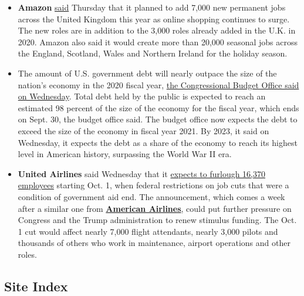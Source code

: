 \begin{itemize}
\item
  \textbf{Amazon}
  \href{https://amazonuk.gcs-web.com/news-releases/news-release-details/amazon-create-10000-new-permanent-jobs-across-uk-2020}{said}
  Thursday that it planned to add 7,000 new permanent jobs across the
  United Kingdom this year as online shopping continues to surge. The
  new roles are in addition to the 3,000 roles already added in the U.K.
  in 2020. Amazon also said it would create more than 20,000 seasonal
  jobs across the England, Scotland, Wales and Northern Ireland for the
  holiday season.
\item
  The amount of U.S. government debt will nearly outpace the size of the
  nation's economy in the 2020 fiscal year,
  \href{https://www.nytimes3xbfgragh.onion/live/2020/09/02/business/stock-market-today-coronavirus/the-federal-debt-is-on-track-to-outpace-us-economy-in-2021-budget-office-says}{the
  Congressional Budget Office said on Wednesday}. Total debt held by the
  public is expected to reach an estimated 98 percent of the size of the
  economy for the fiscal year, which ends on Sept. 30, the budget office
  said. The budget office now expects the debt to exceed the size of the
  economy in fiscal year 2021. By 2023, it said on Wednesday, it expects
  the debt as a share of the economy to reach its highest level in
  American history, surpassing the World War II era.
\item
  \textbf{United Airlines} said Wednesday that it
  \href{https://www.nytimes3xbfgragh.onion/live/2020/09/02/business/stock-market-today-coronavirus/united-airlines-is-set-to-furlough-16000-workers-in-the-fall}{expects
  to furlough 16,370 employees} starting Oct. 1, when federal
  restrictions on job cuts that were a condition of government aid end.
  The announcement, which comes a week after a similar one from
  \textbf{\href{https://www.nytimes3xbfgragh.onion/2020/08/25/business/american-airline-furlough-19000.html}{American
  Airlines}}, could put further pressure on Congress and the Trump
  administration to renew stimulus funding. The Oct. 1 cut would affect
  nearly 7,000 flight attendants, nearly 3,000 pilots and thousands of
  others who work in maintenance, airport operations and other roles.
\end{itemize}

\hypertarget{site-index}{%
\subsection{Site Index}\label{site-index}}

